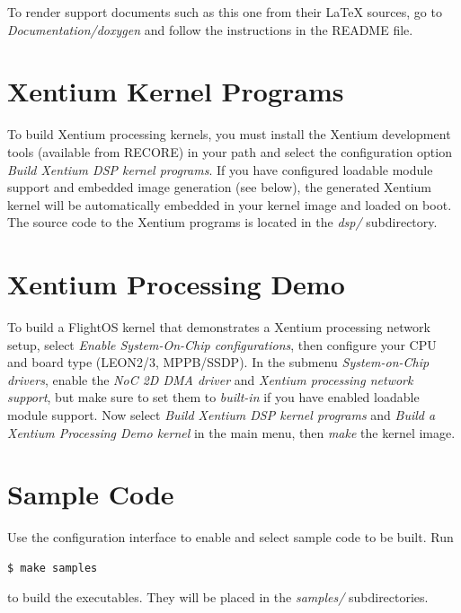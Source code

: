 \noindent
To render support documents such as this one from their LaTeX sources, go
to \emph{Documentation/doxygen} and follow the instructions in the README file.




\section {Xentium Kernel Programs}

To build \gls{Xentium} processing kernels, you must install the Xentium
development tools (available from RECORE) in your path and select the
configuration option \emph{Build Xentium DSP kernel programs}.  If you have
configured loadable module support and embedded image generation (see below),
the generated Xentium kernel will be automatically embedded in your kernel
image and loaded on boot. \\

\noindent
The source code to the Xentium programs is located in the \emph{dsp/}
subdirectory.


\section {Xentium Processing Demo}

To build a FlightOS kernel that demonstrates a Xentium processing network setup,
select \emph{Enable System-On-Chip configurations}, then configure your CPU and
board type (LEON2/3, MPPB/SSDP). In the submenu \emph{System-on-Chip
drivers}, enable the \emph{NoC 2D DMA driver} and \emph{Xentium processing
network support}, but make sure to set them to \emph{built-in} if you have
enabled loadable module support. Now select \emph{Build Xentium DSP kernel
programs} and \emph{Build a Xentium Processing Demo kernel} in the main menu,
then \emph{make} the kernel image.

\section {Sample Code}

Use the configuration interface to enable and select sample code to be built.
Run

\begin{lstlisting}[language=bash]
  $ make samples
\end{lstlisting}

\noindent
to build the executables. They will be placed in the \emph{samples/}
subdirectories.



